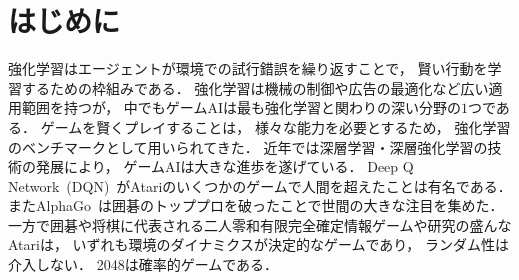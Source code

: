 \chapter{はじめに}
強化学習はエージェントが環境での試行錯誤を繰り返すことで， 賢い行動を学習するための枠組みである．
強化学習は機械の制御や広告の最適化など広い適用範囲を持つが， 中でもゲームAIは最も強化学習と関わりの深い分野の$1$つである．
ゲームを賢くプレイすることは， 様々な能力を必要とするため， 強化学習のベンチマークとして用いられてきた．
近年では深層学習・深層強化学習の技術の発展により， ゲームAIは大きな進歩を遂げている．
Deep Q Network~(DQN)~\cite{DQN}がAtariのいくつかのゲームで人間を超えたことは有名である．
またAlphaGo~\cite{AlphaGo}は囲碁のトッププロを破ったことで世間の大きな注目を集めた．
一方で囲碁や将棋に代表される二人零和有限完全確定情報ゲームや研究の盛んなAtariは， いずれも環境のダイナミクスが決定的なゲームであり， ランダム性は介入しない．
2048は確率的ゲームである．